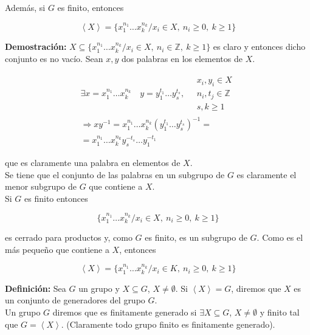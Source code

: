 \documentclass{article}
\begin{document}
Además, si $G$ es finito, entonces

\begin{equation*}
\left\langle X \right\rangle =
\{x_1^{n_1}\ldots x_k^{n_k} / x_i \in X,\: n_i \geq 0,\: k\geq 1\}
\end{equation*}

\textbf{Demostración:} $X\subseteq \{x_1^{n_1}\ldots x_k^{n_k}/x_i\in X,\: n_i\in \mathbb{Z},\:k\geq 1\}$ es claro y entonces dicho conjunto es no vacío. Sean $x,y$ dos palabras en los elementos de $X$. 

\begin{gather*}
\exists x=x_1^{n_1}\ldots x_k^{n_k} \quad y=y_1^{t_1}\ldots y_s^{t_s},\quad 
\left. \begin{array}{c}
x_i,y_i \in X \\
n_i,t_j \in \mathbb{Z} \\
s,k\geq 1
\end{array} \right. \\
\Rightarrow xy^{-1}=x_1^{n_1}\ldots x_k^{n_k}(y_1^{t_1}\ldots y_s^{t_s})^{-1}= \\
=x_1^{n_1}\ldots x_k^{n_k}y_s^{-t_s}\ldots y_1^{-t_1}
\end{gather*}

que es claramente una palabra en elementos de $X$. \\

Se tiene que el conjunto de las palabras en un subgrupo de $G$ es claramente el menor subgrupo de $G$ que contiene a $X$. \\

Si $G$ es finito entonces

\begin{equation*}
\{x_1^{n_1}\ldots x_k^{n_k}/x_i\in X, \: n_i\geq 0,\: k\geq 1\}
\end{equation*}

es cerrado para productos y, como $G$ es finito, es un subgrupo de $G$. Como es el más pequeño que contiene a $X$, entonces

\begin{equation*}
\left\langle X \right\rangle =
\{x_1^{n_1}\ldots x_k^{n_k}/x_i\in K,\:n_i\geq 0,\:k\geq 1\}
\end{equation*}

\textbf{Definición:} Sea $G$ un grupo y $X\subseteq G$, $X\neq \emptyset$. Si $\left\langle X \right\rangle = G$, diremos que $X$ es un conjunto de generadores del grupo $G$. \\

Un grupo $G$ diremos que es finitamente generado si $\exists X \subseteq G$, $X\neq \emptyset$ y finito tal que $G=\left\langle X \right\rangle$. (Claramente todo grupo finito es finitamente generado). \\
\end{document}
